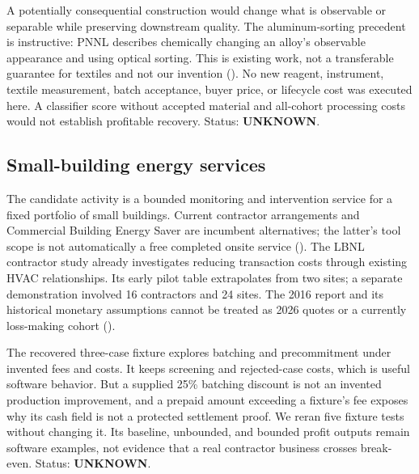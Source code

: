 A potentially consequential construction would change what is observable
or separable while preserving downstream quality. The aluminum-sorting
precedent is instructive: PNNL describes chemically changing an alloy's
observable appearance and using optical sorting. This is existing work,
not a transferable guarantee for textiles and not our invention
(). No new reagent, instrument,
textile measurement, batch acceptance, buyer price, or lifecycle cost
was executed here. A classifier score without accepted material and
all-cohort processing costs would not establish profitable recovery.
Status: \textbf{UNKNOWN}.

\subsection{Small-building energy
services}\label{small-building-energy-services}

The candidate activity is a bounded monitoring and intervention service
for a fixed portfolio of small buildings. Current contractor
arrangements and Commercial Building Energy Saver are incumbent
alternatives; the latter's tool scope is not automatically a free
completed onsite service (). The LBNL contractor study already investigates
reducing transaction costs through existing HVAC relationships. Its
early pilot table extrapolates from two sites; a separate demonstration
involved 16 contractors and 24 sites. The 2016 report and its historical
monetary assumptions cannot be treated as 2026 quotes or a currently
loss-making cohort ().

The recovered three-case fixture explores batching and precommitment
under invented fees and costs. It keeps screening and rejected-case
costs, which is useful software behavior. But a supplied 25\% batching
discount is not an invented production improvement, and a prepaid amount
exceeding a fixture's fee exposes why its cash field is not a protected
settlement proof. We reran five fixture tests without changing it. Its
baseline, unbounded, and bounded profit outputs remain software
examples, not evidence that a real contractor business crosses
break-even. Status: \textbf{UNKNOWN}.

